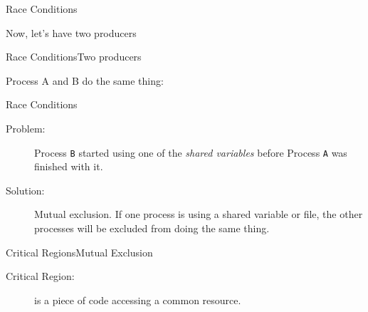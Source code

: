 \begin{frame}{Race Conditions}
  \begin{block}{Now, let's have two producers}
    \centering
    \mode<beamer>{ \texttt{[image: mos-figs-2-18]} }%
  \end{block}
\end{frame}

\begin{frame}{Race Conditions}{Two producers}
  \begin{center}
  \end{center}
  \begin{block}{Process A and B do the same thing:}
    \begin{center}
    \end{center}
  \end{block}
\end{frame}

\begin{frame}{Race Conditions}
  \begin{description}
  \item[Problem:] Process \texttt{B} started using one of the \emph{shared variables} before
    Process \texttt{A} was finished with it.
  \item[Solution:] \alert{Mutual exclusion}. If one process is using a shared variable or
    file, the other processes will be excluded from doing the same thing.
  \end{description}
\end{frame}

\begin{frame}{Critical Regions}{Mutual Exclusion}
  \begin{description}
  \item[Critical Region:] is a piece of code accessing a common resource.
  \end{description}
  \begin{center}
  \end{center}
\end{frame}

